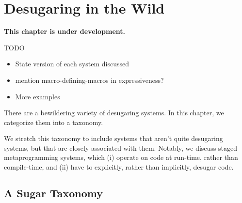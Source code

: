 \chapter{Desugaring in the Wild}\label{chap:taxonomy}

\textbf{This chapter is under development.}

TODO
\begin{itemize}
\item State version of each system discussed
\item mention macro-defining-macros in expressiveness?
\item More examples
\end{itemize}

There are a bewildering variety of desugaring systems.  In this
chapter, we categorize them into a taxonomy.

We stretch this taxonomy to include systems that aren't quite
desugaring systems, but that are closely associated with
them. Notably, we discuss staged metaprogramming systems, which (i)
operate on code at run-time, rather than compile-time, and (ii) have
to explicitly, rather than implicitly, desugar code.

\section{A Sugar Taxonomy}

